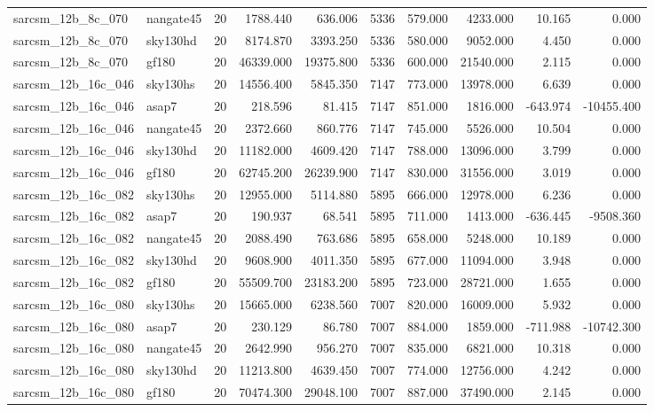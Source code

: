 \begin{tabular}{llrrrrrrrr}
sarcsm\_12b\_8c\_070 & nangate45 & 20 & 1788.440 & 636.006 & 5336 & 579.000 & 4233.000 & 10.165 & 0.000 \\
sarcsm\_12b\_8c\_070 & sky130hd & 20 & 8174.870 & 3393.250 & 5336 & 580.000 & 9052.000 & 4.450 & 0.000 \\
sarcsm\_12b\_8c\_070 & gf180 & 20 & 46339.000 & 19375.800 & 5336 & 600.000 & 21540.000 & 2.115 & 0.000 \\
sarcsm\_12b\_16c\_046 & sky130hs & 20 & 14556.400 & 5845.350 & 7147 & 773.000 & 13978.000 & 6.639 & 0.000 \\
sarcsm\_12b\_16c\_046 & asap7 & 20 & 218.596 & 81.415 & 7147 & 851.000 & 1816.000 & -643.974 & -10455.400 \\
sarcsm\_12b\_16c\_046 & nangate45 & 20 & 2372.660 & 860.776 & 7147 & 745.000 & 5526.000 & 10.504 & 0.000 \\
sarcsm\_12b\_16c\_046 & sky130hd & 20 & 11182.000 & 4609.420 & 7147 & 788.000 & 13096.000 & 3.799 & 0.000 \\
sarcsm\_12b\_16c\_046 & gf180 & 20 & 62745.200 & 26239.900 & 7147 & 830.000 & 31556.000 & 3.019 & 0.000 \\
sarcsm\_12b\_16c\_082 & sky130hs & 20 & 12955.000 & 5114.880 & 5895 & 666.000 & 12978.000 & 6.236 & 0.000 \\
sarcsm\_12b\_16c\_082 & asap7 & 20 & 190.937 & 68.541 & 5895 & 711.000 & 1413.000 & -636.445 & -9508.360 \\
sarcsm\_12b\_16c\_082 & nangate45 & 20 & 2088.490 & 763.686 & 5895 & 658.000 & 5248.000 & 10.189 & 0.000 \\
sarcsm\_12b\_16c\_082 & sky130hd & 20 & 9608.900 & 4011.350 & 5895 & 677.000 & 11094.000 & 3.948 & 0.000 \\
sarcsm\_12b\_16c\_082 & gf180 & 20 & 55509.700 & 23183.200 & 5895 & 723.000 & 28721.000 & 1.655 & 0.000 \\
sarcsm\_12b\_16c\_080 & sky130hs & 20 & 15665.000 & 6238.560 & 7007 & 820.000 & 16009.000 & 5.932 & 0.000 \\
sarcsm\_12b\_16c\_080 & asap7 & 20 & 230.129 & 86.780 & 7007 & 884.000 & 1859.000 & -711.988 & -10742.300 \\
sarcsm\_12b\_16c\_080 & nangate45 & 20 & 2642.990 & 956.270 & 7007 & 835.000 & 6821.000 & 10.318 & 0.000 \\
sarcsm\_12b\_16c\_080 & sky130hd & 20 & 11213.800 & 4639.450 & 7007 & 774.000 & 12756.000 & 4.242 & 0.000 \\
sarcsm\_12b\_16c\_080 & gf180 & 20 & 70474.300 & 29048.100 & 7007 & 887.000 & 37490.000 & 2.145 & 0.000 \\

\end{tabular}

